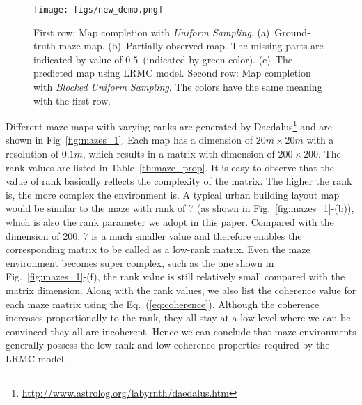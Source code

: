\begin{figure} \vspace{-3pt}
  \centering
  	{\label{fig:demo}\texttt{[image: figs/new\_demo.png]}}
  \caption{\small First row: Map completion with \textit{Uniform Sampling}. (a)~Ground-truth maze map. (b)~Partially observed map. The missing parts are indicated by value of $0.5$~(indicated by green color). (c)~The predicted map using LRMC model. Second row: Map completion with \textit{Blocked Uniform Sampling}. The colors have the same meaning with the first row.
  } \vspace{-10pt}
\label{fig:demo}  
\end{figure}

Different maze maps with varying ranks are generated by Daedalus\footnote{\url{http://www.astrolog.org/labyrnth/daedalus.htm}} and are shown in Fig~\ref{fig:mazes_1}. Each map has a dimension of $20m \times 20m$ with a resolution of $0.1m$, which results in a matrix with dimension of $200\times 200$. The rank values are listed in Table~\ref{tb:maze_prop}. It is easy to observe that the value of rank basically reflects the complexity of the matrix. The higher the rank is, the more complex the environment is. A typical urban building layout map would be similar to the maze with rank of 7 (as shown in Fig.~\ref{fig:mazes_1}-(b)), which is also the rank parameter we adopt in this paper. Compared with the dimension of 200, 7 is a much smaller value and therefore enables the corresponding matrix to be called as a low-rank matrix. Even the maze environment becomes super complex, such as the one shown in Fig.~\ref{fig:mazes_1}-(f), the rank value is still relatively small compared with the matrix dimension. Along with the rank values, we also list the coherence value for each maze matrix using the Eq.~(\ref{eq:coherence}). Although the coherence increases proportionally to the rank, they all stay at a low-level where we can be convinced they all are incoherent. Hence we can conclude that maze environments generally possess the low-rank and low-coherence properties required by the LRMC model. 


